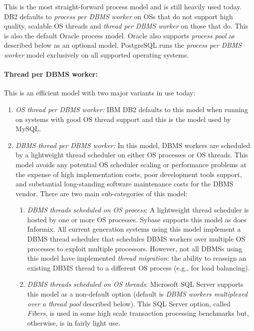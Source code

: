 \documentclass[a4paper,11pt,twoside,openright]{book}
\begin{document}
This is the most straight-forward process model and is still heavily
used today. DB2 defaults to \emph{process per DBMS worker} on OSs that
do not support high quality, scalable OS threads and \emph{thread per
DBMS worker} on those that do. This is also the default Oracle process
model. Oracle also supports \emph{process pool} as described below as an
optional model. PostgreSQL runs the \emph{process per DBMS worker} model
exclusively on all supported operating systems.

\paragraph{Thread per DBMS worker:} This is an efficient model with two
major variants in use today:

\begin{enumerate}
\def\labelenumi{\arabic{enumi}.}
\item
  \emph{OS thread per DBMS worker:} IBM DB2 defaults to this model when
  running on systems with good OS thread support and this is the model
  used by MySQL.
\item
  \emph{DBMS thread per DBMS worker:} In this model, DBMS workers are
  scheduled by a lightweight thread scheduler on either OS processes or
  OS threads. This model avoids any potential OS scheduler scaling or
  performance problems at the expense of high implementation costs, poor
  development tools support, and substantial long-standing software
  maintenance costs for the DBMS vendor. There are two main
  sub-categories of this model:

\begin{enumerate}
\def\labelenumi{\alph{enumi}.}

	\item
	\emph{DBMS} \emph{threads scheduled on OS process}:
A lightweight thread scheduler is hosted by one or more OS processes.
Sybase supports this model as does Informix. All current generation
systems using this model implement a DBMS thread scheduler that
schedules DBMS workers over multiple OS processes to exploit multiple
processors. However, not all DBMSs using this model have implemented
\emph{thread migration}: the ability to reassign an existing DBMS thread
to a different OS process (e.g., for load balancing).

\item
  \emph{DBMS threads scheduled on OS threads}: Microsoft SQL Server
  supports this model as a non-default option (default is \emph{DBMS
  workers multiplexed over} \emph{a thread pool} described below). This
  SQL Server option, called \emph{Fibers}, is used in some high scale
  transaction processing benchmarks but, otherwise, is in fairly light
  use.
\end{enumerate}
\end{enumerate}
\end{document}
